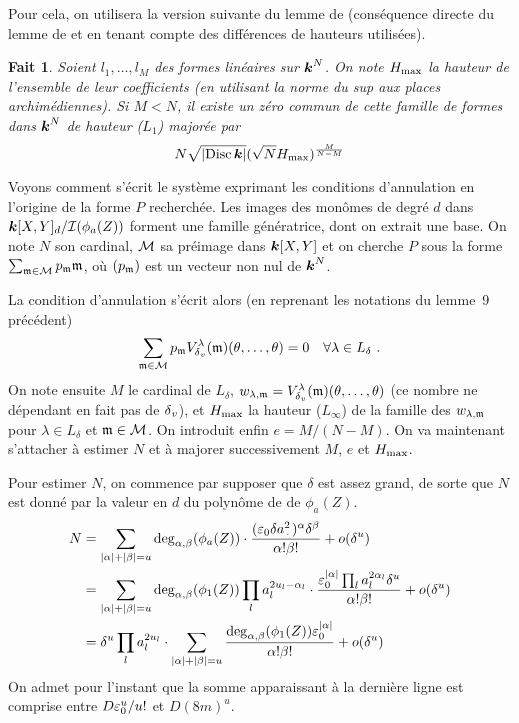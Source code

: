 \documentclass[11pt, twoside, a4paper, draft]{article}
\newtheorem{fait}[thm]{Fait}
\theoremstyle{definition}
\begin{document}
Pour cela, on utilisera la version suivante du lemme de 
(conséquence directe du lemme de  et  en tenant compte
des différences de hauteurs utilisées).

\begin{fait}
  Soient $l_1, \ldots, l_M$ des formes linéaires sur $\boldsymbol{k}^N$. On note $H_{\mathrm{max}}$
  la hauteur de l'ensemble de leur coefficients (en utilisant la norme du sup
  aux places archimédiennes). Si $M < N$, il existe un zéro commun de cette
  famille de formes dans $\boldsymbol{k}^N$ de hauteur ($L_1$) majorée par
  \[
    N \sqrt{\left\lvert\operatorname{Disc}\boldsymbol{k}\right\rvert} ( \sqrt N H_{\mathrm{max}} )^\frac M{N-M}
  \]
\end{fait}

Voyons comment s'écrit le système exprimant les conditions d'annulation en
l'origine de la forme $P$ recherchée. Les images des monômes de degré $d$ dans
$\boldsymbol{k}[X, Y]_d / \mathcal I(\phi_a(Z))$ forment une famille génératrice, dont on
extrait une base.  On note $N$ son cardinal, ${\mathcal M}$ sa préimage dans $\boldsymbol{k}[X,
Y]$ et on cherche $P$ sous la forme $\sum_{{\mathfrak m}\in{\mathcal M}} p_{\mathfrak m} {\mathfrak m}$,
où  $(p_{\mathfrak m})$ est un vecteur non nul de $\boldsymbol{k}^N$.

La condition d'annulation s'écrit alors (en reprenant les notations du lemme~9
précédent) 
\[
  \sum_{{\mathfrak m}\in{\mathcal M}}
  p_{\mathfrak m} V_{\delta\smash{_v}}^\lambda({\mathfrak m})(\theta, \ldots, \theta)
  = 0 \quad 
  \forall \lambda\in L_\delta \text{ .}
\]
On note ensuite $M$ le cardinal de $L_\delta$, $w_{\lambda, {\mathfrak m}} =
V_{\delta\smash{_v}}^\lambda({\mathfrak m})(\theta, \ldots, \theta)$ (ce nombre ne dépendant en fait pas
de ${\delta\smash{_v}}$), et $H_{\mathrm{max}}$ la hauteur ($L_\infty$) de la famille des $w_{\lambda,
  {\mathfrak m}}$ pour $\lambda \in L_\delta$ et ${\mathfrak m} \in {\mathcal M}$. On introduit
enfin $e = M/(N-M)$. On va maintenant s'attacher à estimer $N$ et à majorer
successivement $M$, $e$ et $H_{\mathrm{max}}$.

Pour estimer $N$, on commence par supposer que $\delta$ est assez grand, de
sorte que $N$ est donné par la valeur en $d$ du polynôme de  de
$\phi_a(Z)$. 
\begin{align*}
  N 
  & = \sum_{\lgr\alpha + \lgr\beta = u}
    \deg_{\alpha, \beta}(\phi_a(Z))
    \cdot \frac{ 
      (\eps_0 \delta a_\truc^2)^\alpha \delta^\beta}{%
      \alpha! \beta!}
    + o(\delta^u) \\
  & = \sum_{\lgr\alpha + \lgr\beta = u}
    \deg_{\alpha, \beta}(\phi_1(Z)) \prod_l a_l^{2u_l - \alpha_l}
    \cdot \frac{ 
      \eps_0^{\lgr\alpha} \prod_l a_l^{2\alpha_l} \delta^u}{%
      \alpha! \beta!}
    + o(\delta^u) \\
  & = \delta^u \prod_l a_l^{2u_l} \cdot 
    \sum_{\lgr\alpha + \lgr\beta = u}
    \frac{
      \deg_{\alpha, \beta} (\phi_1(Z)) \eps_0^{\lgr\alpha}}{
      \alpha! \beta!}
    + o(\delta^u)
\end{align*}
On admet pour l'instant que la somme apparaissant à la dernière ligne est
comprise entre $D \varepsilon_0^u / u!$ et $D (8m)^u$.
\end{document}
